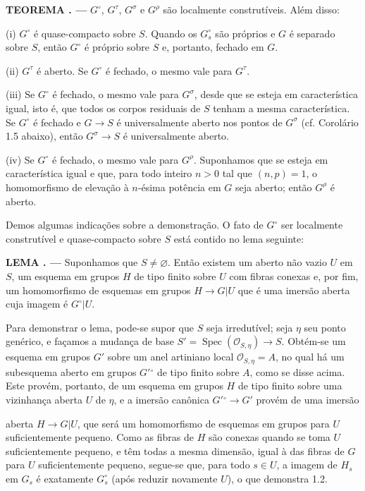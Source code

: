 \documentclass[11pt,twoside,openany]{book}
\numberwithin{equation}{section}
\newcommand{\src}[1]{%
  \phantomsection\hypertarget{src:#1}{}%
  \marginpar{\raggedleft\footnotesize\sffamily #1}%
}
\theoremstyle{plain}
\theoremstyle{definition}
\theoremstyle{remark}
\newcommand{\result}[2]{%
  \par\medskip\noindent\textbf{#1%
  \if\relax\detokenize{#2}\relax\else\space#2\fi. ---}\enspace
}
\newcommand{\FgaUnitKey}{frontmatter}
\renewcommand{\src}[1]{%
  \phantomsection\hypertarget{src:\FgaUnitKey:#1}{}%
  \marginpar{\raggedleft\footnotesize\sffamily #1}%
}
\begin{document}
\result{TEOREMA}{1.1} $G^\circ$, $G^\tau$, $G^\sigma$ e $G^\rho$ são
localmente construtíveis. Além disso:

\noindent (i) $G^\circ$ é quase-compacto sobre $S$. Quando os $G_s^\circ$ são
próprios e $G$ é separado sobre $S$, então $G^\circ$ é próprio sobre $S$ e,
portanto, fechado em $G$.

\noindent (ii) $G^\tau$ é aberto. Se $G^\circ$ é fechado, o mesmo vale para
$G^\tau$.

\noindent (iii) Se $G^\circ$ é fechado, o mesmo vale para $G^\sigma$, desde
que se esteja em característica igual, isto é, que todos os corpos residuais de
$S$ tenham a mesma característica. Se $G^\circ$ é fechado e
$G\longrightarrow S$ é universalmente aberto nos pontos de $G^\sigma$ (cf.
Corolário 1.5 abaixo), então $G^\sigma\longrightarrow S$ é universalmente
aberto.

\noindent (iv) Se $G^\circ$ é fechado, o mesmo vale para $G^\rho$. Suponhamos
que se esteja em característica igual e que, para todo inteiro $n>0$ tal que
$(n,p)=1$, o homomorfismo de elevação à $n$-ésima potência em $G$ seja aberto;
então $G^\rho$ é aberto.

Demos algumas indicações sobre a demonstração. O fato de $G^\circ$ ser
localmente construtível e quase-compacto sobre $S$ está contido no lema
seguinte:

\result{LEMA}{1.2} Suponhamos que $S\neq\varnothing$. Então existem um aberto
não vazio $U$ em $S$, um esquema em grupos $H$ de tipo finito sobre $U$ com
fibras conexas e, por fim, um homomorfismo de esquemas em grupos
$H\longrightarrow G|U$ que é uma imersão aberta cuja imagem é
$G^\circ|U$.

Para demonstrar o lema, pode-se supor que $S$ seja irredutível; seja $\eta$ seu
ponto genérico, e façamos a mudança de base
$S'=\operatorname{Spec}(\mathcal O_{S,\eta})\longrightarrow S$. Obtém-se um
esquema em grupos $G'$ sobre um anel artiniano local
$\mathcal O_{S,\eta}=A$, no qual há um subesquema aberto em grupos
$G'{}^\circ$ de tipo finito sobre $A$, como se disse acima. Este provém,
portanto, de um esquema em grupos $H$ de tipo finito sobre uma vizinhança
aberta $U$ de $\eta$, e a imersão canônica
$G'{}^\circ\longrightarrow G'$ provém de uma imersão
\src{225}
aberta $H\longrightarrow G|U$, que será um homomorfismo de esquemas em grupos
para $U$ suficientemente pequeno. Como as fibras de $H$ são conexas quando se
toma $U$ suficientemente pequeno, e têm todas a mesma dimensão, igual à das
fibras de $G$ para $U$ suficientemente pequeno, segue-se que, para todo
$s\in U$, a imagem de $H_s$ em $G_s$ é exatamente $G_s^\circ$ (após reduzir
novamente $U$), o que demonstra 1.2.
\end{document}

